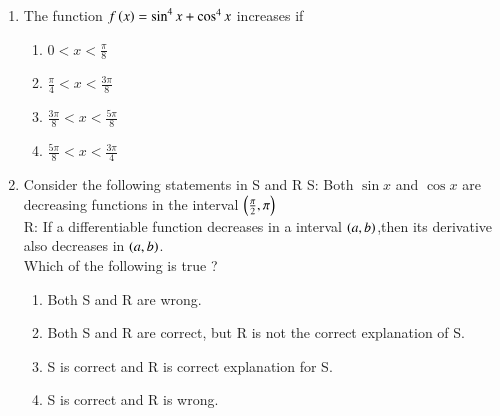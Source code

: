 \documentclass[journal]{IEEEtran}
\begin{document}
\begin{enumerate}[start=9]
\item The function $f\left(x\right)= \sin^4{x}+\cos^4{x}$ increases if \hfill {}
\begin{multicols}{4}
\begin{enumerate}
    \item $0<x<\frac{\pi}{8}$
    \item $\frac{\pi}{4}<x<\frac{3\pi}{8}$
    \item $\frac{3\pi}{8} <x<\frac{5\pi}{8}$
    \item $\frac{5\pi}{8}<x<\frac{3\pi}{4}$
\end{enumerate}
\end{multicols}
\item Consider the following statements in S and R \hfill {}
S: Both $\sin{x}$ and $\cos{x}$ are decreasing functions in the interval $\left(\frac{\pi}{2},\pi\right)$\\
R: If a differentiable function decreases in a interval $\left(a,b\right)$,then its derivative also decreases in $\left(a,b\right)$.\\
Which of the following is true ?
\begin{enumerate}
    \item Both S and R are wrong.
    \item Both S and R are correct, but R is not the correct explanation of S.
    \item S is correct and R is correct explanation for S.
    \item S is correct and R is wrong.
\end{enumerate}


\end{enumerate}
\end{document}
